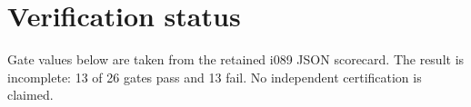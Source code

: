 \section{Verification status}Gate values below are taken from the retained i089 JSON scorecard. The result is incomplete: 13 of 26 gates pass and 13 fail. No independent certification is claimed.
